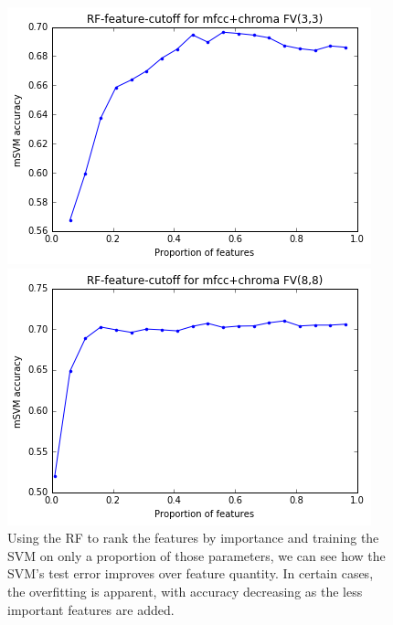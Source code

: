\documentclass[9pt]{article}
\begin{document}
\begin{figure}[H]
    \centering
    
    \begin{minipage}[b]{0.3\textwidth}
        \includegraphics[width=\textwidth]{RF-cutoff3-3.png}
    \end{minipage}
    \hfill
    \begin{minipage}[b]{0.3\textwidth}
        \includegraphics[width=\textwidth]{RF-cutoff8-8.png}
    \end{minipage}
    \label{fig:rf-cutoff}
    \caption{Using the RF to rank the features by importance and training the SVM on only a proportion of those parameters, we can see how the SVM's test error improves over feature quantity. In certain cases, the overfitting is apparent, with accuracy decreasing as the less important features are added.}
\end{figure}
\end{document}
